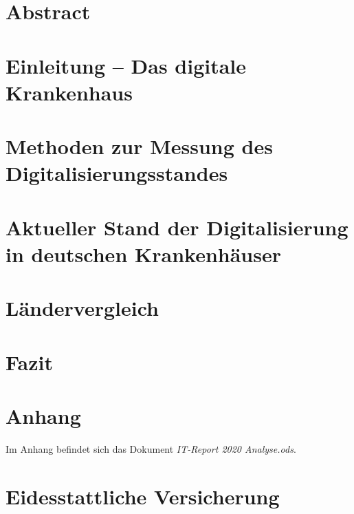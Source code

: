 
\section*{Abstract}

\newpage
\tableofcontents
\newpage
\listoftables
{}
\newpage
\listoffigures
{}
\newpage
\restoregeometry
\setlength{\parskip}{0.5ex}
% 
\section{Einleitung -- Das digitale Krankenhaus}

\section{Methoden zur Messung des Digitalisierungsstandes}

\section{Aktueller Stand der Digitalisierung in deutschen Krankenhäuser} \label{sec:stand in deutschland}

\section{Ländervergleich} \label{sec:laendervergleich}

\section{Fazit}

\newpage
{}
\setcounter{page}{5}
\printbibliography
{}
\newpage
\section*{Anhang}
Im Anhang befindet sich das Dokument \textit{IT-Report 2020 Analyse.ods}. 
\newpage
%
\section*{Eidesstattliche Versicherung}

